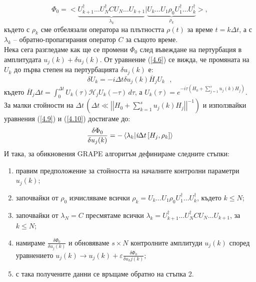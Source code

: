     \begin{equation} \label{4.9}
        \Phi_0 = \bigl<\underbrace{U_{k+1}^\dagger \dots U_N^\dagger CU_N\dots U_{k+1}}_{\lambda_k}|\underbrace{U_k\dots U_1 \rho_0 U_1^\dagger \dots U_k^\dagger}_{\rho_k}\bigr>,
    \end{equation}
    където с $\rho_k$ сме отбелязали оператора на плътността $\rho(t)$ за време $t=k\Delta t$, а с $\lambda_k$ -- обратно-пропагирания оператор $C$ за същото време.\\
    Нека сега разгледаме как ще се промени $\Phi_0$ след въвеждане на пертурбация в амплитудата $u_j(k) + \delta u_j(k)$. От уравнение (\ref{4.6}) се вижда, че промяната на $U_k$ до първа степен на пертурбацията $\delta u_j(k)$ е:
    \begin{equation} \label{4.10}
        \delta U_k = -\textit{i}\Delta t\delta u_j(k)\overline{H}_jU_k \, \, \, \, ,
    \end{equation}
    където $\overline{H}_j \Delta t = \int_{0}^{\Delta t} U_k(\tau)\mathcal{H}_j U_k(-\tau) \,d\tau $, а $U_k(\tau) = e^{-\textit{i}\tau\left(H_0 + \sum_{j=1}^s u_j(k)H_j\right)}$.\\
    За малки стойности на $\Delta t \, \left(\Delta t \ll \left|\left|H_0 + \sum_{k=1}^s u_j(k)H_j\right|\right|^{-1}\right)$ и използвайки уравнения (\ref{4.9}) и (\ref{4.10}) достигаме до:
    \begin{equation}
        \frac{\delta\Phi_0}{\delta u_j(k)} = -\braket{\lambda_k}{\textit{i}\Delta t\left[H_j,\rho_k\right]}
    \end{equation}
    И така, за обикновения GRAPE алгоритъм дефинираме следните стъпки:
    
    \begin{enumerate}
        \item правим предположение за стойността на началните контролни параметри $u_j(k)$;
        \item започвайки от $\rho_0$ изчисляваме всички $\rho_k = U_k\dots U_1\rho_0U_1^\dagger\dots U_k^\dagger$, където $k\le N$;
        \item започвайки от $\lambda_N = C$ пресмятаме всички $\lambda_k = U_{k+1}^\dagger\dots U_N^\dagger CU_N\dots U_{k+1}$, за $k\le N$;
        \item намираме $\frac{\delta \Phi_0}{\delta u_j(k)}$ и обновяваме $s\times N$ контролните амплитуди $u_j(k)$ според уравнението $u_j(k) \rightarrow u_j(k) + \varepsilon \frac{\delta \Phi_0}{\delta u_kj(k)}$;
        \item с така получените данни се връщаме обратно на стъпка 2.
    \end{enumerate}

